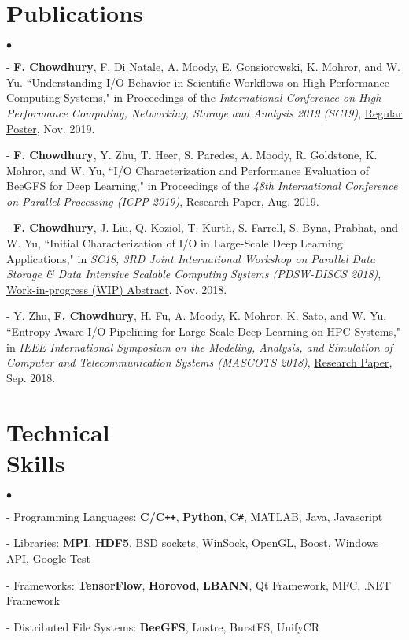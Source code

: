 \documentclass[margin,line]{res}
\newenvironment{list2}{
  \begin{list}{$\bullet$}{%
      \setlength{\itemsep}{0in}
      \setlength{\parsep}{0in} \setlength{\parskip}{0in}
      \setlength{\topsep}{0in} \setlength{\partopsep}{0in} 
      \setlength{\leftmargin}{0.2in}}}{\end{list}}
\begin{document}
\begin{resume}
\section{\sc Publications}
\begin{list2}
\item[ - ] {\bf F. Chowdhury}, F. Di Natale, A. Moody, E. Gonsiorowski, K. Mohror, and W. Yu. ``Understanding I/O Behavior in Scientific Workflows on High Performance Computing Systems," in Proceedings of the \textit{International Conference on High Performance Computing, Networking, Storage and Analysis 2019 (SC19)}, \href{http://sc19.supercomputing.org/proceedings/tech_poster/tech_poster_pages/rpost258.html}{Regular Poster}, Nov. 2019.
\item[ - ] {\bf F. Chowdhury}, Y. Zhu, T. Heer, S. Paredes, A. Moody, R. Goldstone, K. Mohror, and W. Yu, ``I/O Characterization and Performance Evaluation of BeeGFS for Deep Learning," in Proceedings of the \textit{48th International Conference on Parallel Processing (ICPP 2019)}, \href{http://www.osti.gov/servlets/purl/1559405}{Research Paper}, Aug. 2019.
\item[ - ] {\bf F. Chowdhury}, J. Liu, Q. Koziol, T. Kurth, S. Farrell, S. Byna, Prabhat, and W. Yu, ``Initial Characterization of I/O in Large-Scale Deep Learning Applications," in \textit{SC18, 3RD Joint International Workshop on Parallel Data Storage \& Data Intensive Scalable Computing Systems (PDSW-DISCS 2018)}, \href{http://www.pdsw.org/pdsw-discs18/wips/abstracts/chowdhury-wip-pdsw-discs18.pdf}{Work-in-progress (WIP) Abstract}, Nov. 2018.
\item[ - ] Y. Zhu, {\bf F. Chowdhury}, H. Fu, A. Moody, K. Mohror, K. Sato, and W. Yu, ``Entropy-Aware I/O Pipelining for Large-Scale Deep Learning on HPC Systems," in \textit{IEEE International Symposium on the Modeling, Analysis, and Simulation of Computer and Telecommunication Systems (MASCOTS 2018)}, \href{http://www.mscs.mu.edu/~mascots/Papers/72.pdf}{Research Paper}, Sep. 2018.
\end{list2}

\vspace*{-.1in}

\section{\sc Technical \\Skills}
\begin{list2}
\item[ - ] Programming Languages: {\bf C/C\texttt{++}}, {\bf Python}, C\texttt{\#}, MATLAB, Java, Javascript
\item[ - ] Libraries: {\bf MPI}, {\bf HDF5}, BSD sockets, WinSock, OpenGL, Boost, Windows API, Google Test
\item[ - ] Frameworks: {\bf TensorFlow}, {\bf Horovod}, {\bf LBANN}, Qt Framework, MFC, .NET Framework
\item[ - ] Distributed File Systems: {\bf BeeGFS}, Lustre, BurstFS, UnifyCR
\end{list2}

\end{resume}
\end{document}
